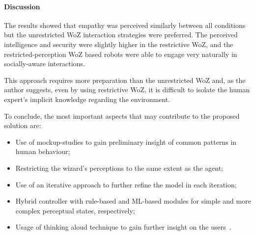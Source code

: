 \paragraph{\textbf{Discussion}} 

The results showed that empathy was perceived similarly between all conditions but the unrestricted \ac{WoZ} interaction strategies were preferred. The perceived intelligence and security were slightly higher in the restrictive \ac{WoZ}, and the restricted-perception \ac{WoZ} based robots were able to engage very naturally in socially-aware interactions.

This approach requires more preparation than the unrestricted \ac{WoZ} and, as the author suggests, even by using restrictive \ac{WoZ}, it is difficult to isolate the human expert's implicit knowledge regarding the environment.

To conclude, the most important aspects that may contribute to the proposed solution are:
\begin{itemize}
	\item Use of mockup-studies to gain preliminary insight of common patterns in human behaviour;
	\item Restricting the wizard's perceptions to the same extent as the agent;
	\item Use of an iterative approach to further refine the model in each iteration;
	\item Hybrid controller with rule-based and \ac{ML}-based modules for simple and more complex perceptual states, respectively;
	\item Usage of thinking aloud technique to gain further insight on the users~\cite{Nielsen1992}.
\end{itemize}